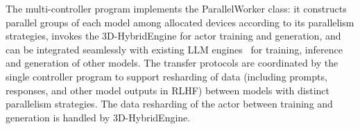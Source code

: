 The multi-controller program implements the ParallelWorker class: it %
constructs parallel groups of each model among allocated devices %
according to its parallelism strategies, 
invokes the 3D-HybridEngine for actor training and generation, and can be integrated seamlessly with existing LLM engines~\cite{shoeybi2019megatron, rasley2020deepspeed, paszke2019pytorch, kwon2023efficient} for training, inference and generation of other models.
The transfer protocols are coordinated by the single controller program to support resharding of data (including prompts, responses, and other model outputs in RLHF) between models with distinct parallelism strategies. The data resharding of the actor between training and generation is handled by 3D-HybridEngine.



